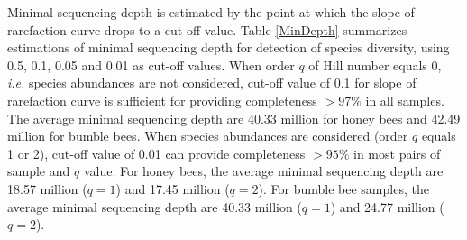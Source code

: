 \documentclass[11pt]{article}
\begin{document}
    Minimal sequencing depth is estimated by the point at which the slope of rarefaction curve drops to a cut-off value. 
    Table \ref{MinDepth} summarizes estimations of minimal sequencing depth for detection of species diversity, using 0.5, 0.1, 0.05 and 0.01 as cut-off values.  
    When order $q$ of Hill number equals 0, \textit{i.e.} species abundances are not considered, cut-off value of 0.1 for slope of rarefaction curve is sufficient for providing completeness $> 97\%$ in all samples. 
    The average minimal sequencing depth are 40.33 million for honey bees and 42.49 million for bumble bees. 
    When species abundances are considered (order $q$ equals 1 or 2), cut-off value of 0.01 can provide completeness $> 95\%$ in most pairs of sample and $q$ value. 
    For honey bees, the average minimal sequencing depth are 18.57 million ($q = 1$) and 17.45 million ($q = 2$). 
    For bumble bee samples, the average minimal sequencing depth are 40.33 million ($q = 1$) and 24.77 million ($q = 2$). 
\end{document}
